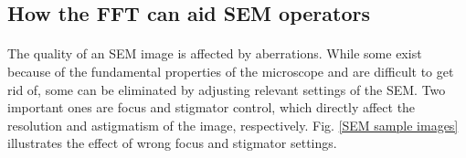 \documentclass[12pt, twocolumn]{report}
\begin{document}
\subsection{How the FFT can aid SEM operators} \label{How the FFT can aid SEM operators}
\paragraph{}
The quality of an SEM image is affected by aberrations. While some exist because of the fundamental properties of the microscope and are difficult to get rid of, some can be eliminated by adjusting relevant settings of the SEM. Two important ones are focus and stigmator control, which directly affect the resolution and astigmatism of the image, respectively. Fig. \ref{SEM sample images} illustrates the effect of wrong focus and stigmator settings.
\end{document}
